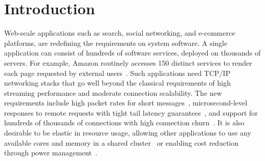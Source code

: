
\section{Introduction}
\label{sec:intro}



Web-scale applications such as search, social networking, and
e-commerce platforms, are redefining the requirements on system
software. A single application can consist of hundreds of software
services, deployed on thousands of servers. For example, Amazon
routinely accesses 150 distinct services to render each page requested
by external users~\cite{DBLP:conf/sosp/DeCandiaHJKLPSVV07}. Such
applications need TCP/IP networking stacks that go well beyond the
classical requirements of high streaming performance and moderate
connection scalability. The new requirements include high packet rates
for short messages~\cite{Atikoglu:2012:WAL}, microsecond-level
responses to remote requests with tight tail latency
guarantees~\cite{DBLP:journals/cacm/DeanB13}, and support for hundreds
of thousands of connections with high connection
churn~\cite{nishtala2013scaling}. It is also desirable to be elastic
in resource usage, allowing other applications to use any available
cores and memory in a shared cluster~\cite{nishtala2013scaling} or
enabling cost reduction through power
management~\cite{DBLP:journals/computer/BarrosoH07}.



